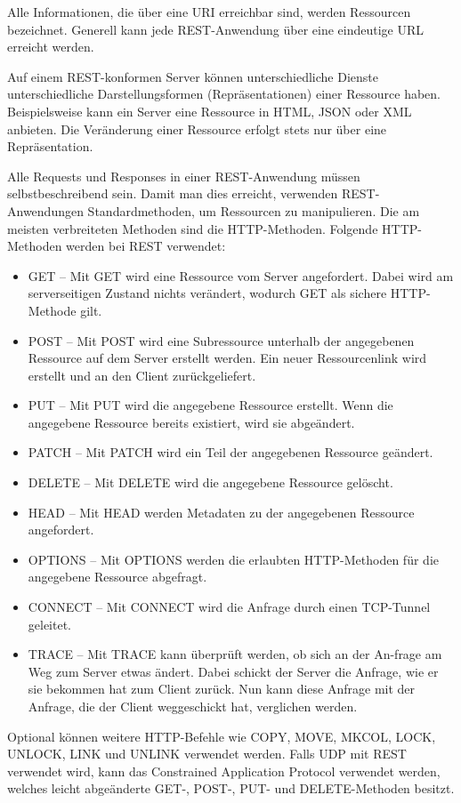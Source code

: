 \pagebreak


Alle Informationen, die über eine URI erreichbar sind, werden Ressourcen bezeichnet. Generell kann jede REST-Anwendung über eine eindeutige URL erreicht werden. \cite{WikiREST}


Auf einem REST-konformen Server können unterschiedliche Dienste unterschiedliche Darstellungsformen (Repräsentationen) einer Ressource haben. Beispielsweise kann ein Server eine Ressource in HTML, JSON oder XML anbieten. Die Veränderung einer Ressource erfolgt stets nur über eine Repräsentation. \cite{WikiREST}


Alle Requests und Responses in einer REST-Anwendung müssen selbstbeschreibend sein. Damit man dies erreicht, verwenden REST-Anwendungen Standardmethoden, um Ressourcen zu manipulieren. Die am meisten verbreiteten Methoden sind die HTTP-Methoden. Folgende HTTP-Methoden werden bei REST verwendet:

\begin{itemize}
    \item GET -- Mit GET wird eine Ressource vom Server angefordert. Dabei wird am serverseitigen Zustand nichts verändert, wodurch GET als sichere HTTP-Methode gilt.
    \item POST -- Mit POST wird eine Subressource unterhalb der angegebenen Ressource auf dem Server erstellt werden. Ein neuer Ressourcenlink wird erstellt und an den Client zurückgeliefert.
    \item PUT -- Mit PUT wird die angegebene Ressource erstellt. Wenn die angegebene Ressource bereits existiert, wird sie abgeändert. 
    \item PATCH -- Mit PATCH wird ein Teil der angegebenen Ressource geändert. 
    \item DELETE -- Mit DELETE wird die angegebene Ressource gelöscht.
    \item HEAD -- Mit HEAD werden Metadaten zu der angegebenen Ressource angefordert. 
    \item OPTIONS -- Mit OPTIONS werden die erlaubten HTTP-Methoden für die angegebene Ressource abgefragt. 
    \item CONNECT -- Mit CONNECT wird die Anfrage durch einen TCP-Tunnel geleitet. 
    \item TRACE -- Mit TRACE kann überprüft werden, ob sich an der An-frage am Weg zum Server etwas ändert. Dabei schickt der Server die Anfrage, wie er sie bekommen hat zum Client zurück. Nun kann diese Anfrage mit der Anfrage, die der Client weggeschickt hat, verglichen werden. 
\end{itemize}

Optional können weitere HTTP-Befehle wie COPY, MOVE, MKCOL, LOCK, UNLOCK, LINK und UNLINK verwendet werden. Falls UDP mit REST verwendet wird, kann das Constrained Application Protocol verwendet werden, welches leicht abgeänderte GET-, POST-, PUT- und DELETE-Methoden besitzt. \cite{WikiREST}
